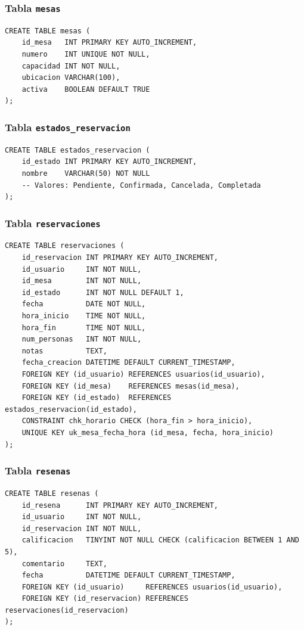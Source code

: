 \documentclass[12pt,a4paper]{article}
\begin{document}
\subsubsection{Tabla \texttt{mesas}}
\begin{lstlisting}[caption={SQL --- Tabla mesas}]
CREATE TABLE mesas (
    id_mesa   INT PRIMARY KEY AUTO_INCREMENT,
    numero    INT UNIQUE NOT NULL,
    capacidad INT NOT NULL,
    ubicacion VARCHAR(100),
    activa    BOOLEAN DEFAULT TRUE
);
\end{lstlisting}

\subsubsection{Tabla \texttt{estados\_reservacion}}
\begin{lstlisting}[caption={SQL --- Tabla estados\_reservacion}]
CREATE TABLE estados_reservacion (
    id_estado INT PRIMARY KEY AUTO_INCREMENT,
    nombre    VARCHAR(50) NOT NULL
    -- Valores: Pendiente, Confirmada, Cancelada, Completada
);
\end{lstlisting}

\subsubsection{Tabla \texttt{reservaciones}}
\begin{lstlisting}[caption={SQL --- Tabla reservaciones (tabla central)}]
CREATE TABLE reservaciones (
    id_reservacion INT PRIMARY KEY AUTO_INCREMENT,
    id_usuario     INT NOT NULL,
    id_mesa        INT NOT NULL,
    id_estado      INT NOT NULL DEFAULT 1,
    fecha          DATE NOT NULL,
    hora_inicio    TIME NOT NULL,
    hora_fin       TIME NOT NULL,
    num_personas   INT NOT NULL,
    notas          TEXT,
    fecha_creacion DATETIME DEFAULT CURRENT_TIMESTAMP,
    FOREIGN KEY (id_usuario) REFERENCES usuarios(id_usuario),
    FOREIGN KEY (id_mesa)    REFERENCES mesas(id_mesa),
    FOREIGN KEY (id_estado)  REFERENCES estados_reservacion(id_estado),
    CONSTRAINT chk_horario CHECK (hora_fin > hora_inicio),
    UNIQUE KEY uk_mesa_fecha_hora (id_mesa, fecha, hora_inicio)
);
\end{lstlisting}

\subsubsection{Tabla \texttt{resenas}}
\begin{lstlisting}[caption={SQL --- Tabla resenas}]
CREATE TABLE resenas (
    id_resena      INT PRIMARY KEY AUTO_INCREMENT,
    id_usuario     INT NOT NULL,
    id_reservacion INT NOT NULL,
    calificacion   TINYINT NOT NULL CHECK (calificacion BETWEEN 1 AND 5),
    comentario     TEXT,
    fecha          DATETIME DEFAULT CURRENT_TIMESTAMP,
    FOREIGN KEY (id_usuario)     REFERENCES usuarios(id_usuario),
    FOREIGN KEY (id_reservacion) REFERENCES reservaciones(id_reservacion)
);
\end{lstlisting}
\end{document}
